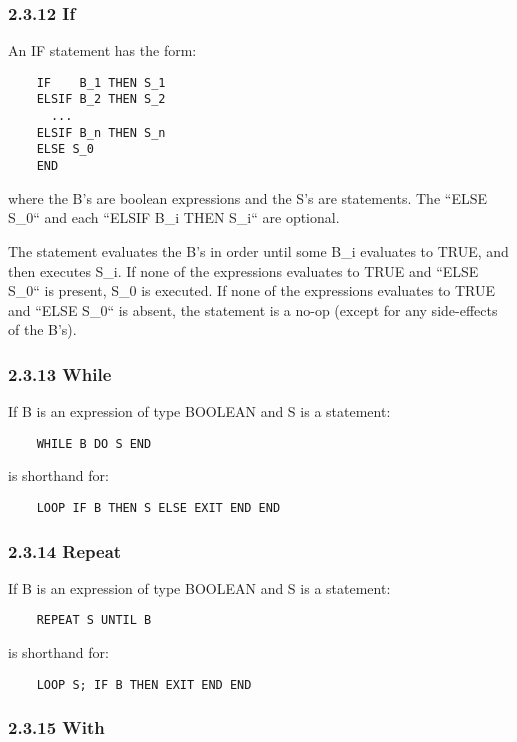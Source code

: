 \documentclass[10pt]{article}
\begin{document}
 
\subsubsection*{2.3.12 If}


  An IF statement has the form: 
\begin{verbatim}
    IF    B_1 THEN S_1
    ELSIF B_2 THEN S_2
      ...
    ELSIF B_n THEN S_n
    ELSE S_0
    END
\end{verbatim}



  where the B's are boolean expressions and the S's are statements. The ``ELSE S\_0`` and each ``ELSIF B\_i THEN S\_i`` are optional. 


  The statement evaluates the B's in order until some B\_i evaluates to TRUE, and then executes S\_i. If none of the expressions evaluates to TRUE and ``ELSE S\_0`` is present, S\_0 is executed. If none of the expressions evaluates to TRUE and ``ELSE S\_0`` is absent, the statement is a no-op (except for any side-effects of the B's). 


 
\subsubsection*{2.3.13 While}


  If B is an expression of type BOOLEAN and S is a statement: 
\begin{verbatim}
    WHILE B DO S END
\end{verbatim}
 is shorthand for: 
\begin{verbatim}
    LOOP IF B THEN S ELSE EXIT END END
\end{verbatim}



 
\subsubsection*{2.3.14 Repeat}


  If B is an expression of type BOOLEAN and S is a statement: 
\begin{verbatim}
    REPEAT S UNTIL B
\end{verbatim}
 is shorthand for: 
\begin{verbatim}
    LOOP S; IF B THEN EXIT END END
\end{verbatim}



 
\subsubsection*{2.3.15 With}
\end{document}
